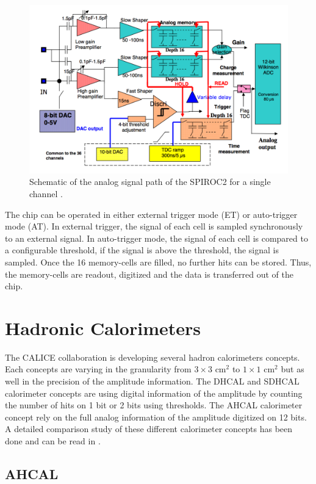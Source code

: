 \begin{figure}[htbp!]
  \centering
  \includegraphics[width=0.7\linewidth]{chap3/fig/SPIROC2B_schematic.png}
  \caption{Schematic of the analog signal path of the SPIROC2 for a single channel \cite{SPIROC2_datasheet}.} \label{fig:SPIROC2B_sche}
\end{figure}

The chip can be operated in either external trigger mode (ET) or auto-trigger mode (AT). In external trigger, the signal of each cell is sampled synchronously to an external signal. In auto-trigger mode, the signal of each cell is compared to a configurable threshold, if the signal is above the threshold, the signal is sampled. Once the 16 memory-cells are filled, no further hits can be stored. Thus, the memory-cells are readout, digitized and the data is transferred out of the chip.

\section{Hadronic Calorimeters}

The CALICE collaboration is developing several hadron calorimeters concepts. Each concepts are varying in the granularity from $3\times3$ cm$^2$ to $1\times1$ cm$^2$ but as well in the precision of the amplitude information. The DHCAL and SDHCAL calorimeter concepts are using digital information of the amplitude by counting the number of hits on 1 bit or 2 bits using thresholds. The AHCAL calorimeter concept rely on the full analog information of the amplitude digitized on 12 bits. A detailed comparison study of these different calorimeter concepts has been done and can be read in \cite{Neubueser2016}.

\subsection{AHCAL}
\label{subsec:AHCAL}

